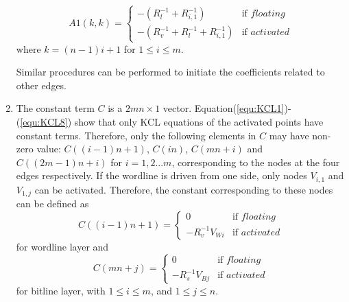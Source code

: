 \begin{enumerate}
    \begin{equation}
    A1(k,k) = \left\{
    \begin{array}{ll}
    -(R_l^{-1}+R_{i,1}^{-1})   & \text{if } floating\\
    -(R_v^{-1}+R_l^{-1}+R_{i,1}^{-1})& \text{if } activated
    \end{array} \right.
    \end{equation}
    where $k=(n-1)i+1$ for $1\leq i\leq m$.

Similar procedures can be performed to initiate the coefficients
related to other edges.

\item The constant term $C$ is a $2mn{\times}1$ vector.
    Equation(\ref{equ:KCL1})-(\ref{equ:KCL8}) show that only KCL
    equations of the activated points have constant terms. Therefore,
    only the following elements in $C$ may have non-zero value:
    $C((i-1)n+1)$, $C(in)$, $C(mn+i)$ and $C((2m-1)n+i)$ for
    $i=1,2...m$, corresponding to the nodes at the four edges
    respectively. If the wordline is driven from one side, only nodes
    $V_{i,1}$ and $V_{1,j}$ can be activated. Therefore, the constant
    corresponding to these nodes can be defined as
\begin{equation}
    C((i-1)n+1) = \left\{
    \begin{array}{ll}
    0   & \text{if } floating\\
    -R_v^{-1}V_{Wi}& \text{if } activated
    \end{array} \right.
    \end{equation}
for wordline layer and
\begin{equation}
    C(mn+j) = \left\{
    \begin{array}{ll}
    0   & \text{if } floating\\
    -R_s^{-1}V_{Bj}& \text{if } activated
    \end{array} \right.
    \end{equation}
for bitline layer, with $1\leq i\leq m$, and $1\leq j\leq n$.
\end{enumerate}
